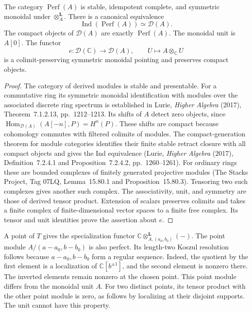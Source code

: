 \begin{proposition}
\label{v4-arith:eis:parameter-perf}
The category $\operatorname{Perf}(A)$ is stable, idempotent complete,
and symmetric monoidal under $\otimes_A^{\mathbf L}$.
There is a canonical equivalence
\[
 \operatorname{Ind}(\operatorname{Perf}(A))\simeq\mathcal D(A).
\]
The compact objects of $\mathcal D(A)$ are exactly $\operatorname{Perf}(A)$.
The monoidal unit is $A[0]$.
The functor
\[
 e:\mathcal D(\mathbb C)\longrightarrow\mathcal D(A),
 \qquad U\longmapsto A\otimes_{\mathbb C}U
\]
is a colimit-preserving symmetric monoidal pointing and preserves compact objects.
\end{proposition}

\begin{proof}
The category of derived modules is stable and presentable.
For a commutative ring its symmetric monoidal identification with
modules over the associated discrete ring spectrum is established in
Lurie, \emph{Higher Algebra} (2017), Theorem~7.1.2.13, pp.~1212--1213.
Its shifts of $A$ detect zero objects, since
$\operatorname{Hom}_{\mathcal D(A)}(A[-n],P)=H^n(P)$.
These shifts are compact because cohomology commutes with filtered colimits of modules.
The compact-generation theorem for module categories identifies their
finite stable retract closure with all compact objects and gives the Ind equivalence
(Lurie, \emph{Higher Algebra} (2017), Definition~7.2.4.1 and Proposition~7.2.4.2, pp.~1260--1261).
For ordinary rings these are bounded complexes of finitely generated projective modules
(The Stacks Project, Tag 07LQ, Lemma~15.80.1 and Proposition~15.80.3).
Tensoring two such complexes gives another such complex.
The associativity, unit, and symmetry are those of derived tensor product.
Extension of scalars preserves colimits and takes a finite complex of
finite-dimensional vector spaces to a finite free complex.
Its tensor and unit identities prove the assertion about $e$.
\end{proof}

A point of $T$ gives the specialization functor
$\mathbb C\otimes_{A,(a_0,b_0)}^{\mathbf L}(-)$.
The point module $A/(a-a_0,b-b_0)$ is also perfect.
Its length-two Koszul resolution follows because $a-a_0,b-b_0$ form a regular sequence.
Indeed, the quotient by the first element is a localization of
$\mathbb C[b^{\pm1}]$, and the second element is nonzero there.
The inverted elements remain nonzero at the chosen point.
This point module differs from the monoidal unit $A$.
For two distinct points, its tensor product with the other point module is zero,
as follows by localizing at their disjoint supports.
The unit cannot have this property.

